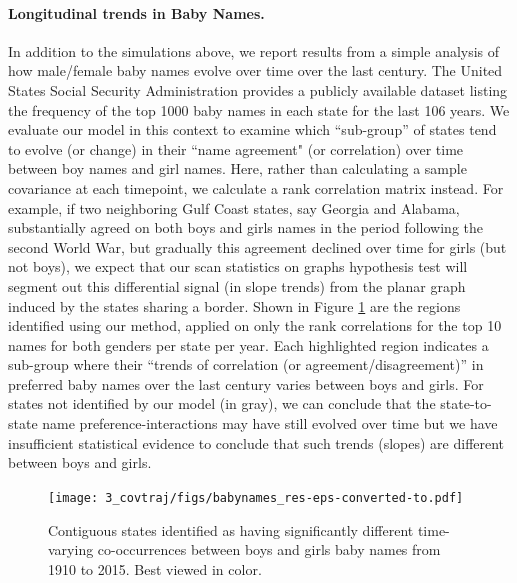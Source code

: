 \paragraph{Longitudinal trends in Baby Names.} In addition to the simulations above, we report results from a simple analysis of 
how male/female baby names evolve over time over the last century. 
The United States Social Security Administration provides a publicly available dataset listing the frequency of the 
top 1000 baby names in each state for the last 106 years.
We evaluate our model in this context to examine which ``sub-group'' of states tend to evolve (or change) in their
``name agreement" (or correlation) over time between boy names and girl names.
Here, rather than calculating a sample covariance
at each timepoint, we calculate a rank correlation matrix instead. 
For example, if two neighboring Gulf Coast states, say Georgia and Alabama, substantially 
agreed on both boys and girls names in the period following the second World War, but gradually this agreement 
declined over time for girls (but not boys), 
we expect that our scan statistics on graphs hypothesis test 
will segment out this differential signal (in slope trends) from the planar graph induced by the states sharing 
a border.
Shown in Figure \ref{fig:usmap} are the regions identified using our method, applied on only the rank correlations for the top 10 names for both genders per state per year. Each highlighted region indicates a sub-group
where their ``trends of correlation (or agreement/disagreement)'' in preferred baby names over the last century 
varies between boys and girls. 
For states not identified by our model (in gray), we can conclude that
the state-to-state name preference-interactions may have still 
evolved over time but we have insufficient statistical 
evidence to conclude that such trends (slopes) are different between boys and girls. 

\begin{figure}
	\begin{center}
		\texttt{[image: 3\_covtraj/figs/babynames\_res-eps-converted-to.pdf]}
		\caption[Covariance trajectory difference testing results on baby name frequency in the contiguous United States.]{\label{fig:usmap} Contiguous states identified as having significantly different time-varying co-occurrences between boys and girls baby names from 1910 to 2015. Best viewed in color.}
	\end{center}
\end{figure}

